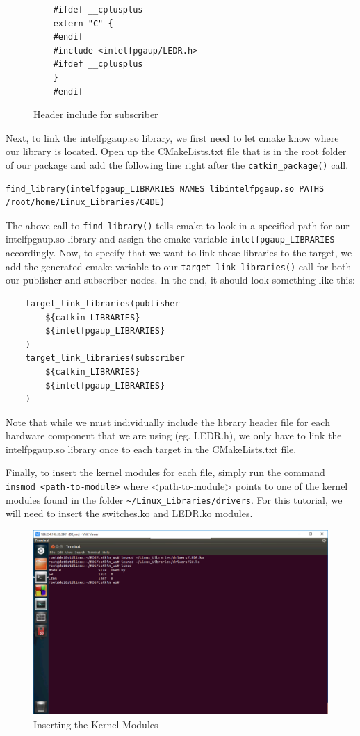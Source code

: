 \documentclass[11pt, twoside, pdftex]{article}
\begin{document}
\begin{figure}[H]
	\begin{lstlisting}
	#ifdef __cplusplus
	extern "C" {
	#endif
	#include <intelfpgaup/LEDR.h>
	#ifdef __cplusplus
	}
	#endif
	\end{lstlisting}
	\caption{Header include for subscriber}
	\label{lst:subscriberheader}
\end{figure}
Next, to link the intelfpgaup.so library, we first need to let cmake know where our library is located. Open up the CMakeLists.txt file that is in the root folder of our package and add the following line right after the \lstinline|catkin_package()| call.
\begin{lstlisting}
find_library(intelfpgaup_LIBRARIES NAMES libintelfpgaup.so PATHS /root/home/Linux_Libraries/C4DE)
\end{lstlisting}
The above call to \lstinline|find_library()| tells cmake to look in a specified path for our intelfpgaup.so library and assign the cmake variable \lstinline|intelfpgaup_LIBRARIES| accordingly. Now, to specify that we want to link these libraries to the target, we add the generated cmake variable to our \lstinline|target_link_libraries()| call for both our publisher and subscriber nodes. In the end, it should look something like this:
\begin{lstlisting}
	target_link_libraries(publisher
		${catkin_LIBRARIES}
		${intelfpgaup_LIBRARIES}
	)
	target_link_libraries(subscriber
		${catkin_LIBRARIES}
		${intelfpgaup_LIBRARIES}
	)
\end{lstlisting}
Note that while we must individually include the library header file for each hardware component that we are using (eg. LEDR.h), we only have to link the intelfpgaup.so library once to each target in the CMakeLists.txt file. 

Finally, to insert the kernel modules for each file, simply run the command \lstinline|insmod <path-to-module>| where <path-to-module> points to one of the kernel modules found in the folder \lstinline|~/Linux_Libraries/drivers|. For this tutorial, we will need to insert the switches.ko and LEDR.ko modules.

\begin{figure}[H]
	\begin{center}
		\includegraphics[scale=0.55]{figures/insmod_SW_LEDR.png}
		\caption{Inserting the Kernel Modules}
		\label{fig:insmodSWLEDR}
	\end{center}
\end{figure}
\end{document}
